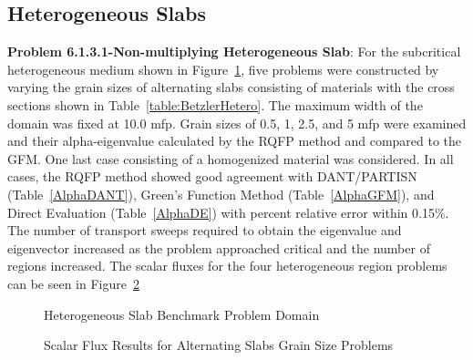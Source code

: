 \clearpage
\subsection{Heterogeneous Slabs}

\textbf{Problem 6.1.3.1-Non-multiplying Heterogeneous Slab}: For the subcritical heterogeneous medium shown in Figure~\ref{fig:HeteroSlabDomain}, five problems were constructed by varying the grain sizes of alternating slabs consisting of materials with the cross sections shown in Table~\ref{table:BetzlerHetero}. The maximum width of the domain was fixed at 10.0 mfp. Grain sizes of 0.5, 1, 2.5, and 5 mfp were examined and their alpha-eigenvalue calculated by the RQFP method and compared to the GFM. One last case consisting of a homogenized material was considered. In all cases, the RQFP method showed good agreement with DANT/PARTISN (Table~\ref{AlphaDANT}), Green's Function Method (Table~\ref{AlphaGFM}), and Direct Evaluation (Table~\ref{AlphaDE}) with percent relative error within 0.15\%. The number of transport sweeps required to obtain the eigenvalue and eigenvector increased as the problem approached critical and the number of regions increased. The scalar fluxes for the four heterogeneous region problems can be seen in Figure~\ref{fig:GrainScalarFlux}

\begin{figure}[h]
	\centering
	
	\caption{Heterogeneous Slab Benchmark Problem Domain \cite{kornreich_timeeigenvalue_2005}}
	\label{fig:HeteroSlabDomain}
\end{figure}

\begin{figure}[h]
	\centering
	\resizebox{0.50\textwidth}{!}{
	
	}
	\caption{Scalar Flux Results for Alternating Slabs Grain Size Problems}
	\label{fig:GrainScalarFlux}
\end{figure}

